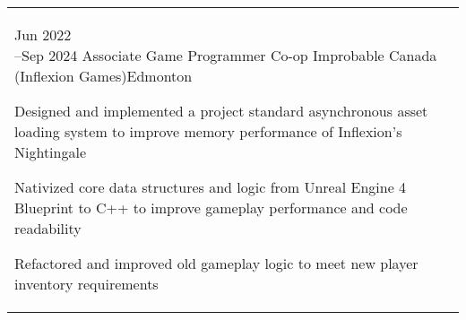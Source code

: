 \documentclass[a4paper]{modernsimplecv}
\begin{document}

    \subsection*{}
    \vspace{-4em}

    \setlength{\columnsep}{0.03\textwidth}
    \small
    \begin{paracol}{2}

        \begin{minipage}[t]{\rightcolwidth}

            \vspace{1em}
            \section*{}

            \begin{tabular}{@{\raggedright}p{} |>{\raggedright\arraybackslash}p{}}
                \cvevent{Jun 2022\newline --Sep 2024}
                {Associate Game Programmer Co-op}
                {Improbable Canada (Inflexion Games)}{Edmonton}
                {\begin{tabitemize}
                    \item Designed and implemented a project standard asynchronous asset loading system to improve memory performance of Inflexion's Nightingale
                    \item Nativized core data structures and logic from Unreal Engine 4 Blueprint to C++ to improve gameplay performance and code readability
                    \item Refactored and improved old gameplay logic to meet new player inventory requirements
                \end{tabitemize}
                } \\


\end{tabular}
\end{minipage}
\end{paracol}
\end{document}
